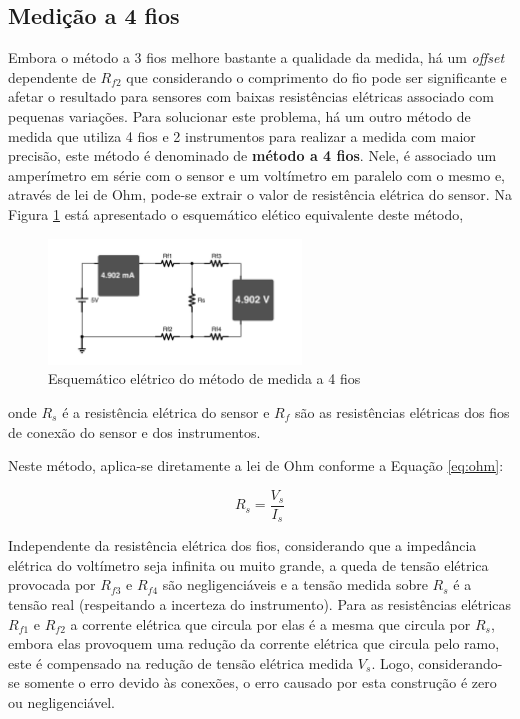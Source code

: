 \documentclass[a4paper]{instrumentacao}
\begin{document}

\subsection{Medição a 4 fios}

Embora o método a 3 fios melhore bastante a qualidade da medida, há um \textit{offset} dependente de $R_{f2}$ que considerando o comprimento do fio pode ser significante e afetar o resultado para sensores com baixas resistências elétricas associado com pequenas variações. Para solucionar este problema, há um outro método de medida que utiliza 4 fios e 2 instrumentos para realizar a medida com maior precisão, este método é denominado de \textbf{método a 4 fios}. Nele, é associado um amperímetro em série com o sensor e um voltímetro em paralelo com o mesmo e, através de lei de Ohm, pode-se extrair o valor de resistência elétrica do sensor. Na Figura \ref{fig:4wire-circuit} está apresentado o esquemático elético equivalente deste método,

\begin{figure}[H]
\centering
\includegraphics[width=0.6\textwidth]{4WireMeasure.pdf}
\caption{Esquemático elétrico do método de medida a 4 fios}
\label{fig:4wire-circuit}
\end{figure}

\noindent onde $R_s$ é a resistência elétrica do sensor e $R_f$ são as resistências elétricas dos fios de conexão do sensor e dos instrumentos.

Neste método, aplica-se diretamente a lei de Ohm conforme a Equação \ref{eq:ohm}:

\begin{equation}
	R_s = \frac{V_s}{I_s}
	\label{eq:ohm}
\end{equation}

Independente da resistência elétrica dos fios, considerando que a impedância elétrica do voltímetro seja infinita ou muito grande, a queda de tensão elétrica provocada por $R_{f3}$ e $R_{f4}$ são negligenciáveis e a tensão medida sobre $R_s$ é a tensão real (respeitando a incerteza do instrumento). Para as resistências elétricas $R_{f1}$ e $R_{f2}$ a corrente elétrica que circula por elas é a mesma que circula por $R_s$, embora elas provoquem uma redução da corrente elétrica que circula pelo ramo, este é compensado na redução de tensão elétrica medida $V_s$. Logo, considerando-se somente o erro devido às conexões, o erro causado por esta construção é zero ou negligenciável.
\end{document}
